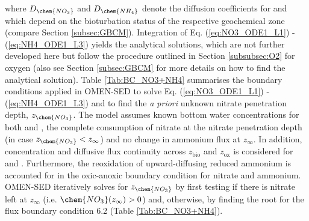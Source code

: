 \documentclass[gmd, manuscript]{copernicus}
\begin{document}
where $D_\chem{NO_3}$ and $D_{\chem{NH_4}}$ denote the diffusion coefficients for  and  which depend on the bioturbation status of the respective geochemical zone (compare Section \ref{subsec:GBCM}). 
Integration of Eq. (\ref{eq:NO3_ODE1_L1}) - (\ref{eq:NH4_ODE1_L3}) yields the analytical solutions, which are not further developed here but follow the procedure outlined in Section \ref{subsubsec:O2} for oxygen 
(also see Section \ref{subsec:GBCM} for more details on how to find the analytical solution). Table \ref{Tab:BC_NO3+NH4} summarises the boundary conditions applied in OMEN-SED to solve Eq. (\ref{eq:NO3_ODE1_L1}) - (\ref{eq:NH4_ODE1_L3}) 
and to find the \textit{a priori} unknown nitrate penetration depth, $z_\chem{NO_3}$. 
The model assumes known bottom water concentrations for both  and , the complete consumption of nitrate at the nitrate penetration depth (in case  $z_{\chem{NO_3}} < z_\infty$) and no change in %
ammonium flux at $z_\infty$. In addition, concentration and diffusive flux continuity across $z_{\mathrm{bio}}$ and $z_{\mathrm{ox}}$ is considered for  and . 
Furthermore, the reoxidation of upward-diffusing reduced ammonium is accounted for in the oxic-anoxic boundary condition for nitrate and ammonium. 
OMEN-SED iteratively solves for $z_{\chem{NO_3}}$ by first testing if there is nitrate left at $z_\infty$ (i.e. $\chem{NO_3}(z_\infty) > 0$) and, otherwise, by finding the root for the flux 
boundary condition 6.2 (Table \ref{Tab:BC_NO3+NH4}).
\end{document}
